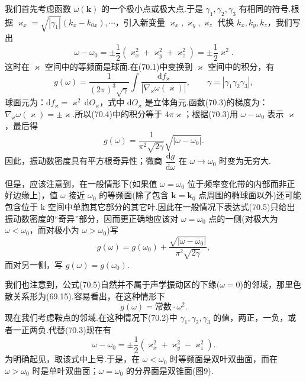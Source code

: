 我们首先考虑函数 $\omega(\boldsymbol{k})$ 的一个极小点或极大点.于是 $\gamma_1,\gamma_2,\gamma_3$ 有相同的符号.根据 $\varkappa_x=\sqrt{|\gamma_1|}\left(k_x-k_{0x}\right),\cdots$，引入新变量 $\varkappa_x,\varkappa_y,\varkappa_z$ 代换 $k_x,k_y,k_z$，我们写出
\begin{equation}
  \omega-\omega_0=\pm\frac{1}{2}\left(\varkappa_x^2+\varkappa_y^2+\varkappa_z^2\right)=\pm\frac{1}{2}\varkappa^2.
\end{equation}
这时在 $\varkappa$ 空间中的等频面是球面.在(70.1)中变换到 $\varkappa$ 空间中的积分，有
\begin{equation}
  g(\omega)=\frac{1}{(2\pi)^3\sqrt{\gamma}}\int\frac{\mathrm{d}f_{\varkappa}}{\left|\nabla_{\varkappa}\omega(\varkappa)\right|},\qquad
  \gamma=\left|\gamma_1\gamma_2\gamma_3\right|,
\end{equation}
球面元为：$\mathrm{d}f_{\varkappa}=\varkappa^2\,\mathrm{d}O_{\varkappa}$，式中 $\mathrm{d}O_{\varkappa}$ 是立体角元.函数(70.3)的梯度为：$\nabla_{\varkappa}\omega(\varkappa)=\pm\varkappa$.所以(70.4)中的积分等于 $4\pi\varkappa$；根据(70.3)用 $\omega-\omega_0$ 表示 $\varkappa$，最后得
\begin{equation}
  g(\omega)=\frac{1}{\pi^2\sqrt{2\gamma}}\sqrt{\left|\omega-\omega_0\right|}.
\end{equation}
因此，振动数密度具有平方根奇异性；微商 $\dfrac{\mathrm{d}g}{\mathrm{d}\omega}$ 在 $\omega\to\omega_0$ 时变为无穷大.

但是，应该注意到，在一般情形下(如果值 $\omega=\omega_0$ 位于频率变化带的内部而非正好边缘上)，值 $\omega$ 接近 $\omega_0$ 的等频面(除了包含 $\boldsymbol{k}=\boldsymbol{k}_0$ 点周围的椭球面以外)还可能包含位于 k 空间中单胞其它部分的其它叶.因此在一般情况下表达式(70.5)只给出振动数密度的“奇异”部分，因而更正确地应该对 $\omega=\omega_0$ 点的一侧(对极大为 $\omega<\omega_0$，而对极小为 $\omega>\omega_0$)写
\begin{equation}
  g(\omega)=g(\omega_0)+\frac{\sqrt{\left|\omega-\omega_0\right|}}{\pi^2\sqrt{2\gamma}},
\end{equation}
而对另一侧，写 $g(\omega)=g(\omega_0)$.

我们也注意到，公式(70.5)自然并不属于声学振动区的下缘($\omega=0$)的邻域，那里色散关系形为(69.15).容易看出，在这种情形下
\begin{equation}
  g(\omega)=\text{常数}\cdot\omega^2.
\end{equation}
现在我们考虑鞍点的邻域.在这种情况下(70.2)中 $\gamma_1,\gamma_2,\gamma_3$ 的值，两正，一负，或者一正两负.代替(70.3)现在有
\begin{equation}
  \omega-\omega_0=\pm\frac{1}{2}\left(\varkappa_x^2+\varkappa_y^2-\varkappa_z^2\right).
\end{equation}
为明确起见，取该式中上号.于是，在 $\omega<\omega_0$ 时等频面是双叶双曲面，而在 $\omega>\omega_0$ 时是单叶双曲面；$\omega=\omega_0$ 的分界面是双锥面(图9).

